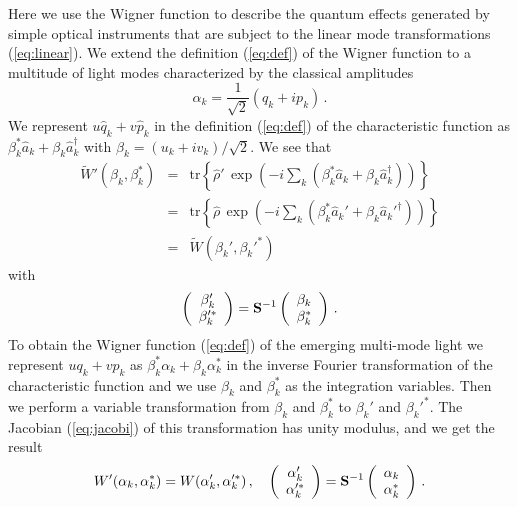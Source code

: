 \documentclass[12pt,amsmath,amssymb]{article}
\def\underline#1{{\bf #1}}
\numberwithin{equation}{section}
\begin{document}
Here we use the Wigner function to describe the quantum effects
generated by simple optical instruments that are subject to the
linear mode transformations (\ref{eq:linear}). We extend the
definition (\ref{eq:def}) of the Wigner function to a multitude
of light modes characterized by the classical amplitudes
\begin{equation}
\alpha_k = \frac{1}{\sqrt{2}} (q_k+ip_k) \,.
\end{equation}
We represent $u\hat{q}_k+v\hat{p}_k$ in the definition
(\ref{eq:def}) of the characteristic function as
$\beta_k^*\hat{a}_k+\beta_k\hat{a}_k^\dagger$ with
$\beta_k=(u_k+iv_k)/\sqrt{2}$. We see that
\begin{eqnarray}
\widetilde{W}'(\beta_k,\beta_k^*) &=&
\mathrm{tr}\left\{\hat{\rho}'\, \exp\left(-i\sum_k
(\beta_k^*\hat{a}_k+\beta_k\hat{a}_k^\dagger)\right)\right\}
\nonumber\\
&=& \mathrm{tr}\left\{\hat{\rho}\, \exp\left(-i\sum_k
(\beta_k^*\hat{a}_k'+\beta_k\hat{a}_k'^\dagger)\right)\right\}
\nonumber\\
&=& \widetilde{W}(\beta_k',\beta_k'^*)
\end{eqnarray}
with
\begin{equation}
\left(
    \begin{array}{c}
     \beta_k'  \\
     \beta_k'^*
    \end{array}
\right) = \underline{S}^{-1} \left(
    \begin{array}{c}
     \beta_k  \\
     \beta_k^*
    \end{array}
\right)\,.
\end{equation}
To obtain the Wigner function (\ref{eq:def}) of the emerging
multi-mode light we represent $uq_k+vp_k$ as
$\beta_k^*\alpha_k+\beta_k\alpha_k^*$ in the inverse Fourier
transformation of the characteristic function and we use
$\beta_k$ and $\beta_k^*$ as the integration variables. Then we
perform a variable transformation from $\beta_k$ and $\beta_k^*$
to $\beta_k'$ and $\beta_k'^*$. The Jacobian (\ref{eq:jacobi}) of
this transformation has unity modulus, and we get the result
\begin{equation}
\label{eq:wignertrans} W'(\alpha_k,\alpha_k^*) =
W(\alpha_k',\alpha_k'^*) \,,\quad \left(
    \begin{array}{c}
     \alpha_k'  \\
     \alpha_k'^*
    \end{array}
\right) = \underline{S}^{-1} \left(
    \begin{array}{c}
     \alpha_k  \\
     \alpha_k^*
    \end{array}
\right)\,.
\end{equation}
\end{document}
